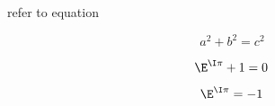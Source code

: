 
refer to equation 

\begin{equation}\label{eq_test2_1}
a^2+b^2=c^2~
\end{equation}

\begin{equation}\label{eq_test2_2}
\E^{\I \pi}+1=0~
\end{equation}

\begin{equation}
\E^{\I \pi}=-1~
\end{equation}

